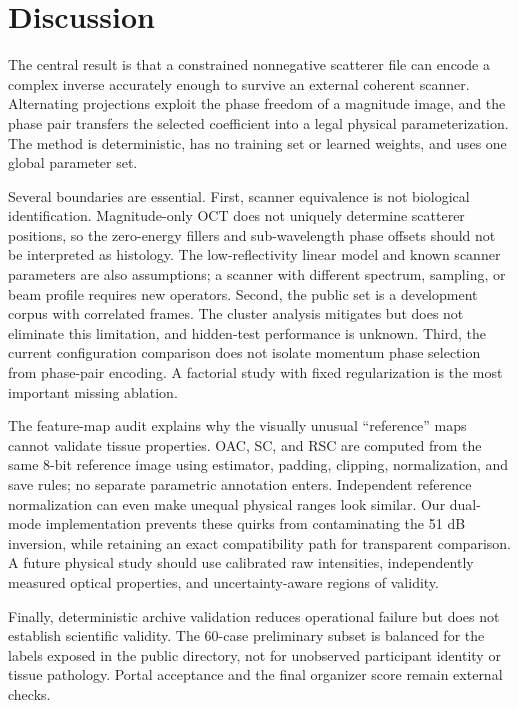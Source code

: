 \documentclass[runningheads]{llncs}
\begin{document}
\section{Discussion}

The central result is that a constrained nonnegative scatterer file can encode
a complex inverse accurately enough to survive an external coherent scanner.
Alternating projections exploit the phase freedom of a magnitude image, and
the phase pair transfers the selected coefficient into a legal physical
parameterization. The method is deterministic, has no training set or learned
weights, and uses one global parameter set.

Several boundaries are essential. First, scanner equivalence is not biological
identification. Magnitude-only OCT does not uniquely determine scatterer
positions, so the zero-energy fillers and sub-wavelength phase offsets should
not be interpreted as histology. The low-reflectivity linear model and known
scanner parameters are also assumptions; a scanner with different spectrum,
sampling, or beam profile requires new operators. Second, the public set is a
development corpus with correlated frames. The cluster analysis mitigates but
does not eliminate this limitation, and hidden-test performance is unknown.
Third, the current configuration comparison does not isolate momentum phase
selection from phase-pair encoding. A factorial study with fixed
regularization is the most important missing ablation.

The feature-map audit explains why the visually unusual ``reference'' maps
cannot validate tissue properties. OAC, SC, and RSC are computed from the same
8-bit reference image using estimator, padding, clipping, normalization, and
save rules; no separate parametric annotation enters. Independent reference
normalization can even make unequal physical ranges look similar. Our dual-mode
implementation prevents these quirks from contaminating the 51 dB inversion,
while retaining an exact compatibility path for transparent comparison. A
future physical study should use calibrated raw intensities, independently
measured optical properties, and uncertainty-aware regions of validity.

Finally, deterministic archive validation reduces operational failure but does
not establish scientific validity. The 60-case preliminary subset is balanced
for the labels exposed in the public directory, not for unobserved participant
identity or tissue pathology. Portal acceptance and the final organizer score
remain external checks.
\end{document}
